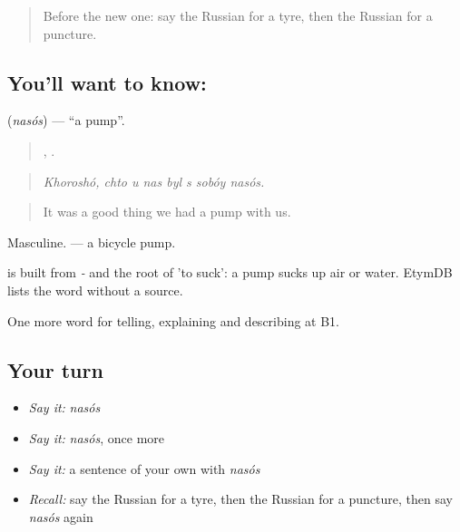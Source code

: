 \label{lesson:RU-C405-nasos}



\begin{quote}
Before the new one: say the Russian for a tyre, then the Russian for a puncture.
\end{quote}

\subsection*{You'll want to know: }
\textbf{} (\emph{nasós}) — \textquotedblleft{}a pump\textquotedblright{}.

\begin{quote}
,       .
\end{quote}

\begin{quote}
\emph{Khoroshó, chto u nas byl s sobóy nasós.}
\end{quote}

\begin{quote}
It was a good thing we had a pump with us.
\end{quote}

Masculine. \emph{ } — a bicycle pump.

\begin{cousinweb}
\emph{} is built from \emph{-} and the root of \emph{} 'to suck': a pump sucks up air or water. EtymDB lists the word without a source.
\end{cousinweb}

\begin{grammarlens}[title={What you've built}]
One more word for telling, explaining and describing at B1.
\end{grammarlens}

\subsection*{Your turn}
\begin{itemize}
\raggedright
  \item \emph{Say it:} \emph{nasós}
  \item \emph{Say it:} \emph{nasós}, once more
  \item \emph{Say it:} a sentence of your own with \emph{nasós}
  \item \emph{Recall:} say the Russian for a tyre, then the Russian for a puncture, then say \emph{nasós} again
\end{itemize}

